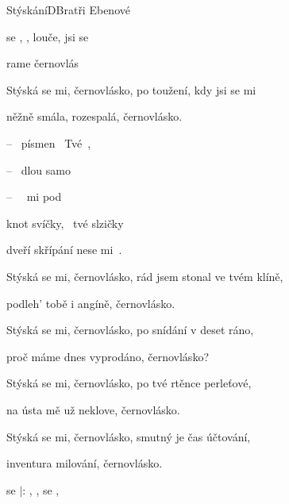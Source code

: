 \begin{song}{Stýskání}{D}{Bratři Ebenové}
\begin{SBVerse}
 se , ,  louče,  jsi se  

 rame  černovlás

\end{SBVerse}
\begin{SBVerse}

Stýská se mi, černovlásko, po toužení, kdy jsi se mi

něžně smála, rozespalá, černovlásko.

\end{SBVerse}
\begin{SBChorus}
 --  písmen  Tvé ,

 --  dlou samo

 --   mi pod 

 knot svíčky,  tvé slzičky

dveří skřípání nese mi .

  \end{SBChorus}
\begin{SBVerse}
Stýská se mi, černovlásko, rád jsem stonal ve tvém klíně,

podleh' tobě i angíně, černovlásko.
\end{SBVerse}
\begin{SBVerse}

Stýská se mi, černovlásko, po snídání v deset ráno,

proč máme dnes vyprodáno, černovlásko?

  \end{SBVerse}

\begin{SBChorus} 
 \end{SBChorus}

  \begin{SBVerse}
Stýská se mi, černovlásko, po tvé rtěnce perleťové,

na ústa mě už neklove, černovlásko.

\end{SBVerse}
\begin{SBVerse}

Stýská se mi, černovlásko, smutný je čas účtování,

inventura milování, černovlásko.

  \end{SBVerse}
\begin{SBChorus*}
  se $|$: , ,   se , 
 \end{SBChorus*}
 \end{song}
